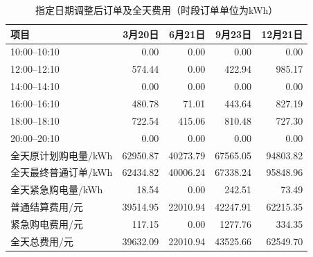 \begin{table}[H]
\centering
\caption{指定日期调整后订单及全天费用（时段订单单位为kWh）}
\label{tab:q3_final_order}
\small
\setlength{\tabcolsep}{5pt}
\begin{tabular}{lrrrr}
\toprule
项目 & 3月20日 & 6月21日 & 9月23日 & 12月21日 \\
\midrule
10:00--10:10 & 0.00 & 0.00 & 0.00 & 0.00 \\
12:00--12:10 & 574.44 & 0.00 & 422.94 & 985.17 \\
14:00--14:10 & 0.00 & 0.00 & 0.00 & 0.00 \\
16:00--16:10 & 480.78 & 71.01 & 443.64 & 827.19 \\
18:00--18:10 & 722.54 & 415.06 & 810.48 & 727.30 \\
20:00--20:10 & 0.00 & 0.00 & 0.00 & 0.00 \\
\midrule
全天原计划购电量/kWh & 62950.87 & 40273.79 & 67565.05 & 94803.82 \\
全天最终普通订单/kWh & 62434.82 & 40006.24 & 67338.24 & 95848.96 \\
全天紧急购电量/kWh & 18.54 & 0.00 & 242.51 & 73.49 \\
普通结算费用/元 & 39514.95 & 22010.94 & 42247.91 & 62215.35 \\
紧急购电费用/元 & 117.15 & 0.00 & 1277.76 & 334.35 \\
全天总费用/元 & 39632.09 & 22010.94 & 43525.66 & 62549.70 \\
\bottomrule
\end{tabular}
\end{table}
